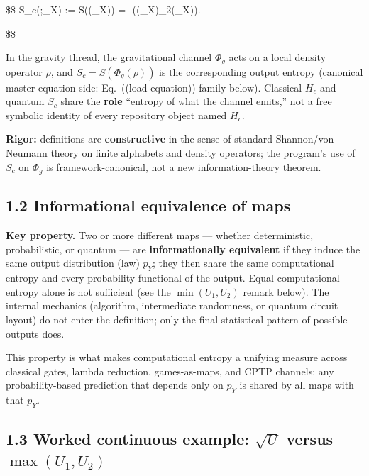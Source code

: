 \documentclass[
  11pt,
]{article}
\begin{document}
\$\$ S\_c(\Phi;\rho\_X) := S\bigl(\Phi(\rho\_X)\bigr) = -\bigl(\Phi(\rho\_X)\log\_2\Phi(\rho\_X)\bigr).

\$\$

In the gravity thread, the gravitational channel \(\Phi_g\) acts on a local density operator \(\rho\), and \(S_c = S(\Phi_g(\rho))\) is the corresponding output entropy (canonical master-equation side: Eq.~((load equation)) family below). Classical \(H_c\) and quantum \(S_c\) share the \textbf{role} ``entropy of what the channel emits,'' not a free symbolic identity of every repository object named \(H_c\).

\textbf{Rigor:} definitions are \textbf{constructive} in the sense of standard Shannon/von Neumann theory on finite alphabets and density operators; the program's use of \(S_c\) on \(\Phi_g\) is framework-canonical, not a new information-theory theorem.

\subsection{1.2 Informational equivalence of maps}\label{informational-equivalence-of-maps}

\textbf{Key property.} Two or more different maps --- whether deterministic, probabilistic, or quantum --- are \textbf{informationally equivalent} if they induce the same output distribution (law) \(p_Y\); they then share the same computational entropy and every probability functional of the output. Equal computational entropy alone is not sufficient (see the \(\min(U_1,U_2)\) remark below). The internal mechanics (algorithm, intermediate randomness, or quantum circuit layout) do not enter the definition; only the final statistical pattern of possible outputs does.

This property is what makes computational entropy a unifying measure across classical gates, lambda reduction, games-as-maps, and CPTP channels: any probability-based prediction that depends only on \(p_Y\) is shared by all maps with that \(p_Y\).

\subsection{\texorpdfstring{1.3 Worked continuous example: \(\sqrt{U}\) versus \(\max(U_1,U_2)\)}{1.3 Worked continuous example: \textbackslash sqrt\{U\} versus \textbackslash max(U\_1,U\_2)}}\label{worked-continuous-example-sqrtu-versus-maxu_1u_2}
\end{document}
